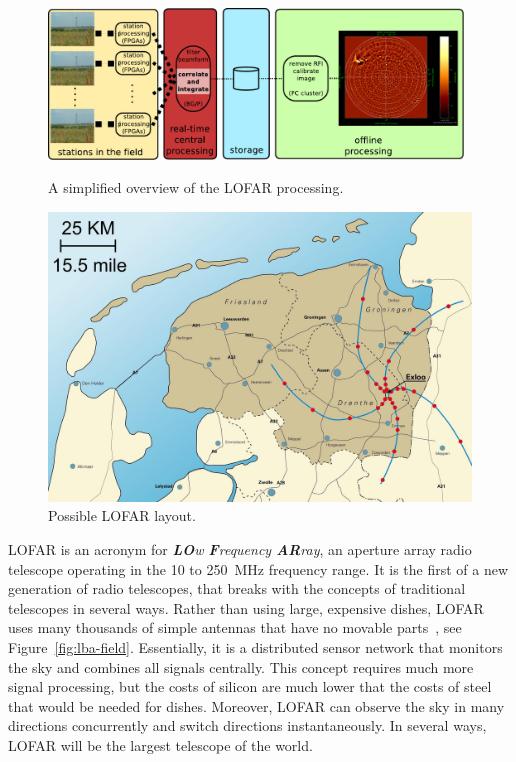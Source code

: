 \documentclass{article}
\begin{document}
\begin{figure}
\begin{minipage}[b]{11cm}
\includegraphics[width=11cm]{figures/lofar-overview.pdf}
\caption{A simplified overview of the LOFAR processing.}
\label{fig:lofar-overview}
\end{minipage}
\hfill
\begin{minipage}[b]{56mm}
\includegraphics[width=\columnwidth]{figures/map.jpg}
\caption{Possible LOFAR layout.}
\label{fig:map}
\end{minipage}
\end{figure}

LOFAR is an acronym for \emph{\textbf{LO}w \textbf{F}requency
  \textbf{AR}ray}, an aperture array radio telescope operating in the
10 to 250~MHz frequency range.  It is the first of a new generation of
radio telescopes, that breaks with the concepts of traditional
telescopes in several ways.  Rather than using large, expensive
dishes, LOFAR uses many thousands of simple antennas that have no
movable parts~\cite{Butcher:04,deVos:09}, see
Figure~\ref{fig:lba-field}.  Essentially, it is a distributed sensor
network that monitors the sky and combines all signals centrally.
This concept requires much more signal processing, but the 
costs of silicon are much lower that the costs of steel that would
be needed for dishes. Moreover, LOFAR can observe the sky in many
directions concurrently and switch directions instantaneously.  In
several ways, LOFAR will be the largest telescope of the world.
\end{document}
